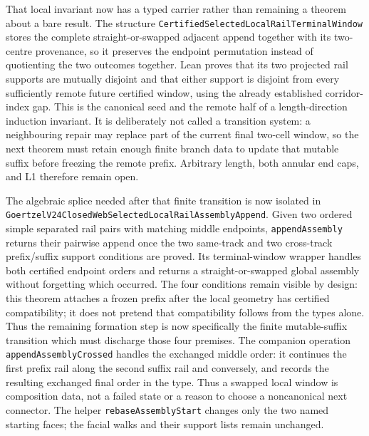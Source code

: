 \documentclass[11pt]{article}
\theoremstyle{definition}
\begin{document}
That local invariant now has a typed carrier rather than remaining a theorem
about a bare result.  The structure
\texttt{CertifiedSelectedLocalRailTerminalWindow} stores the complete
straight-or-swapped adjacent append together with its two-centre provenance,
so it preserves the endpoint permutation instead of quotienting the two
outcomes together.  Lean proves that its two projected rail supports are
mutually disjoint and that either support is disjoint from every sufficiently
remote future certified window, using the already established corridor-index
gap.  This is the canonical seed and the remote half of a length-direction
induction invariant.  It is deliberately not called a transition system: a
neighbouring repair may replace part of the current final two-cell window, so
the next theorem must retain enough finite branch data to update that mutable
suffix before freezing the remote prefix.  Arbitrary length, both annular end
caps, and L1 therefore remain open.

The algebraic splice needed after that finite transition is now isolated in
\texttt{GoertzelV24ClosedWebSelectedLocalRailAssemblyAppend}.  Given two
ordered simple separated rail pairs with matching middle endpoints,
\texttt{appendAssembly} returns their pairwise append once the two same-track
and two cross-track prefix/suffix support conditions are proved.  Its
terminal-window wrapper handles both certified endpoint orders and returns a
straight-or-swapped global assembly without forgetting which occurred.  The
four conditions remain visible by design: this theorem attaches a frozen
prefix after the local geometry has certified compatibility; it does not
pretend that compatibility follows from the types alone.  Thus the remaining
formation step is now specifically the finite mutable-suffix transition which
must discharge those four premises.
The companion operation \texttt{appendAssemblyCrossed} handles the exchanged
middle order: it continues the first prefix rail along the second suffix rail
and conversely, and records the resulting exchanged final order in the type.
Thus a swapped local window is composition data, not a failed state or a
reason to choose a noncanonical next connector.
The helper \texttt{rebaseAssemblyStart} changes only the two named starting
faces; the facial walks and their support lists remain unchanged.
\end{document}
